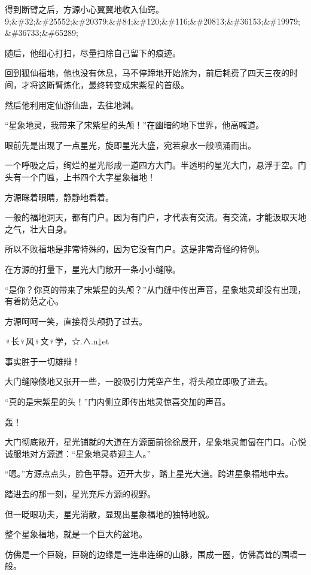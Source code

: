 
\begin{this_body}

得到断臂之后，方源小心翼翼地收入仙窍。9;\&\#32;\&\#25552;\&\#20379;\&\#84;\&\#120;\&\#116;\&\#20813;\&\#36153;\&\#19979;\&\#36733;\&\#65289;

随后，他细心打扫，尽量扫除自己留下的痕迹。

回到狐仙福地，他也没有休息，马不停蹄地开始施为，前后耗费了四天三夜的时间，才将这断臂炼化，最终转变成宋紫星的首级。

然后他利用定仙游仙蛊，去往地渊。

“星象地灵，我带来了宋紫星的头颅！”在幽暗的地下世界，他高喊道。

眼前先是出现了一点星光，旋即星光大盛，宛若泉水一般喷涌而出。

一个呼吸之后，绚烂的星光形成一道四方大门。半透明的星光大门，悬浮于空。门头有一个门匾，上书四个大字星象福地！

方源眯着眼睛，静静地看着。

一般的福地洞天，都有门户。因为有门户，才代表有交流。有交流，才能汲取天地之气，壮大自身。

所以不败福地是非常特殊的，因为它没有门户。这是非常奇怪的特例。

在方源的打量下，星光大门敞开一条小小缝隙。

“是你？你真的带来了宋紫星的头颅？”从门缝中传出声音，星象地灵却没有出现，有着防范之心。

方源呵呵一笑，直接将头颅扔了过去。

♀长♀风♀文♀学，☆.∧.n↓et

事实胜于一切雄辩！

大门缝隙倏地又张开一些，一股吸引力凭空产生，将头颅立即吸了进去。

“真的是宋紫星的头！”门内侧立即传出地灵惊喜交加的声音。

轰！

大门彻底敞开，星光铺就的大道在方源面前徐徐展开，星象地灵匍匐在门口。心悦诚服地对方源道：“星象地灵恭迎主人。”

“嗯。”方源点点头，脸色平静。迈开大步，踏上星光大道。跨进星象福地中去。

踏进去的那一刻，星光充斥方源的视野。

但一眨眼功夫，星光消散，显现出星象福地的独特地貌。

整个星象福地，就是一个巨大的盆地。

仿佛是一个巨碗，巨碗的边缘是一连串连绵的山脉，围成一圈，仿佛高耸的围墙一般。


\end{this_body}
